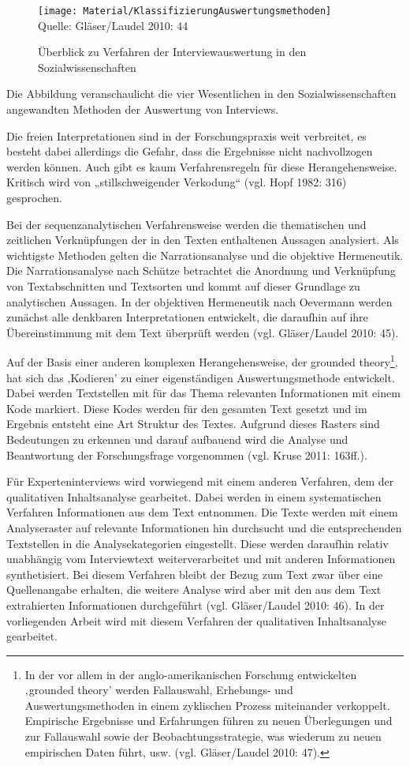 \begin{figure}
\caption{Überblick zu Verfahren der Interviewauswertung in den Sozialwissenschaften}
\texttt{[image: Material/KlassifizierungAuswertungsmethoden]}\\
\scriptsize{Quelle: Gläser/Laudel 2010: 44}
\end{figure}
Die Abbildung veranschaulicht die vier Wesentlichen in den Sozialwissenschaften angewandten Methoden der Auswertung von Interviews.\par
Die freien Interpretationen sind in der Forschungspraxis weit verbreitet, es besteht dabei allerdings die Gefahr, dass die Ergebnisse nicht nachvollzogen werden können. Auch gibt es kaum Verfahrensregeln für diese Herangehensweise. Kritisch wird von „stillschweigender Verkodung“ (vgl. Hopf 1982: 316) gesprochen.\par
Bei der sequenzanalytischen Verfahrensweise werden die thematischen und zeitlichen Verknüpfungen der in den Texten enthaltenen Aussagen analysiert. Als wichtigste Methoden gelten die Narrationsanalyse und die objektive Hermeneutik. Die Narrationsanalyse nach Schütze betrachtet die Anordnung und Verknüpfung von Textabschnitten und Textsorten und kommt auf dieser Grundlage zu analytischen Aussagen. In der objektiven Hermeneutik nach Oevermann werden zunächst alle denkbaren Interpretationen entwickelt, die daraufhin auf ihre Übereinstimmung mit dem Text überprüft werden (vgl. Gläser/Laudel 2010: 45).\par
Auf der Basis einer anderen komplexen Herangehensweise, der grounded theory\footnote{In der vor allem in der anglo-amerikanischen Forschung entwickelten ‚grounded theory’ werden Fallauswahl, Erhebungs- und Auswertungsmethoden in einem zyklischen Prozess miteinander verkoppelt. Empirische Ergebnisse und Erfahrungen führen zu neuen Überlegungen und zur Fallauswahl sowie der Beobachtungsstrategie, was wiederum zu neuen empirischen Daten führt, usw. (vgl. Gläser/Laudel 2010: 47).}, hat sich das ‚Kodieren’ zu einer eigenständigen Auswertungsmethode entwickelt. Dabei werden Textstellen mit für das Thema relevanten Informationen mit einem Kode markiert. Diese Kodes werden für den gesamten Text gesetzt und im Ergebnis entsteht eine Art Struktur des Textes. Aufgrund dieses Rasters sind Bedeutungen zu erkennen und darauf aufbauend wird die Analyse und Beantwortung der Forschungsfrage vorgenommen (vgl. Kruse 2011: 163ff.).\par
Für Experteninterviews wird vorwiegend mit einem anderen Verfahren, dem der qualitativen Inhaltsanalyse gearbeitet. Dabei werden in einem systematischen Verfahren Informationen aus dem Text entnommen. Die Texte werden mit einem Analyseraster auf relevante Informationen hin durchsucht und die entsprechenden Textstellen in die Analysekategorien eingestellt. Diese werden daraufhin relativ unabhängig vom Interviewtext weiterverarbeitet und mit anderen Informationen synthetisiert. Bei diesem Verfahren bleibt der Bezug zum Text zwar über eine Quellenangabe erhalten, die weitere Analyse wird aber mit den aus dem Text extrahierten Informationen durchgeführt (vgl. Gläser/Laudel 2010: 46). In der vorliegenden Arbeit wird mit diesem Verfahren der qualitativen Inhaltsanalyse gearbeitet. \par
